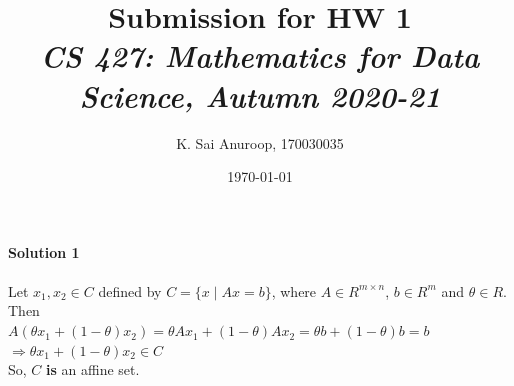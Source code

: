 \documentclass{article}
\title{Submission for HW 1\\\small{\textit{CS 427: Mathematics for Data Science, Autumn 2020-21}}}
\author{K. Sai Anuroop, 170030035}
\date{\today}
\begin{document}
\maketitle

\begin{flushleft}
\textbf{Solution 1}\\~\\
Let $x_{1},x_{2}\in C$ defined by $C=\{x\mid Ax=b\}$, where $A\in R^{m\times n}$, $b\in R^{m}$ and $\theta\in R$. Then\\
$A(\theta x_{1}+(1-\theta)x_{2})=\theta Ax_{1}+(1-\theta)Ax_{2}=\theta b+(1-\theta)b=b$
$\Rightarrow \theta x_{1}+(1-\theta)x_{2}\in C$\\
So, $C$ \textbf{is} an affine set.\\~\\


\end{flushleft}
\end{document}
